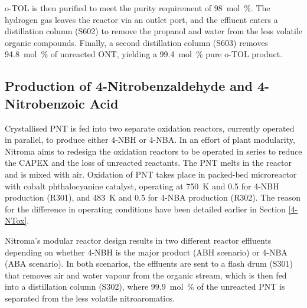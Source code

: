 
o-TOL is then purified to meet the purity requirement of \SI{98}{mol\percent}. The hydrogen gas leaves the reactor via an outlet port, and the effluent enters a distillation column (S602) to remove the propanol and water from the less volatile organic compounds. Finally, a second distillation column (S603) removes \SI{94.8}{mol\percent} of unreacted ONT, yielding a \SI{99.4}{mol\percent} pure o-TOL product.
 
\subsection{Production of 4-Nitrobenzaldehyde and 4-Nitrobenzoic Acid}
Crystallised PNT is fed into two separate oxidation reactors, currently operated in parallel, to produce either 4-NBH or 4-NBA. In an effort of plant modularity, Nitroma aims to redesign the oxidation reactors to be operated in series to reduce the CAPEX and the loss of unreacted reactants. The PNT melts in the reactor and is mixed with air. Oxidation of PNT takes place in packed-bed microreactor with cobalt phthalocyanine catalyst, operating at \SI{750}{\K} and \SI{0.5}{\atm} for 4-NBH production (R301), and \SI{483}{\K} and \SI{0.5}{\atm} for 4-NBA production (R302). The reason for the difference in operating conditions have been detailed earlier in Section \ref{4-NTox}.


Nitroma's modular reactor design results in two different reactor effluents depending on whether 4-NBH is the major product (ABH scenario) or 4-NBA (ABA scenario). In both scenarios, the effluents are sent to a flash drum (S301) that removes air and water vapour from the organic stream, which is then fed into a distillation column (S302), where \SI{99.9}{mol\percent} of the unreacted PNT is separated from the less volatile nitroaromatics. 

